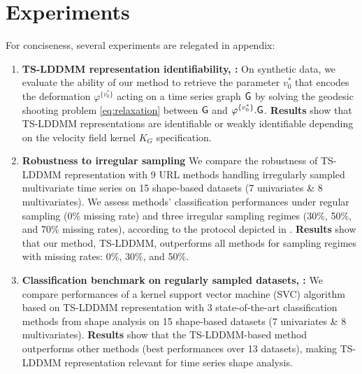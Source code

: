 \section{Experiments}
\vspace{-1ex}
\label{section:experiments}

For conciseness, several experiments are relegated in appendix: 

\begin{enumerate}
    \item \textbf{TS-LDDMM representation identifiability, :} On synthetic data, we evaluate the ability of our method to retrieve the parameter $v_0^*$ that encodes the deformation $\varphi^{\{v_0^*\}}$ acting on a time series graph $\mathsf{G}$ by solving the geodesic shooting problem \eqref{eq:relaxation} between $\mathsf{G}$ and $\varphi^{\{v_0^*\}}.\mathsf{G}$.
     \textbf{Results} show that TS-LDDMM representations are identifiable or weakly identifiable depending on the velocity field kernel $K_G$ specification.
  
    \item \textbf{Robustness to irregular sampling} We compare the robustness of TS-LDDMM representation with 9 URL methods handling irregularly sampled multivariate time series on 15 shape-based datasets (7 univariates \& 8 multivariates).
     We assess methods' classification performances under regular sampling (0\% missing rate) and three irregular sampling regimes (30\%, 50\%, and 70\% missing rates), according to the protocol depicted in \cite{kidger2020neural}.
      \textbf{Results} show that our method, TS-LDDMM, outperforms all methods for sampling regimes with missing rates: 0\%, 30\%, and 50\%.
    
    \item \textbf{Classification benchmark on regularly sampled datasets, :} We compare performances of a kernel support vector machine (SVC) algorithm based on TS-LDDMM representation with 3 state-of-the-art classification methods from shape analysis on 15 shape-based datasets (7 univariates \& 8 multivariates). \textbf{Results} show that the TS-LDDMM-based method outperforms other methods (best performances over 13 datasets), making TS-LDDMM representation relevant for time series shape analysis.
\end{enumerate}

